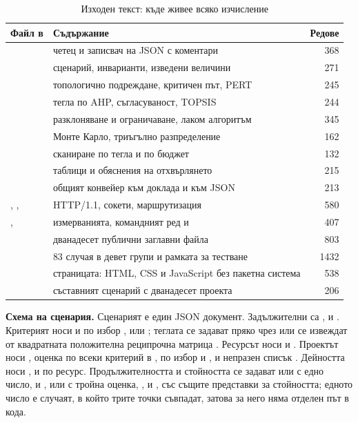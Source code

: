 \begin{table}[H]
\centering
\caption{Изходен текст: къде живее всяко изчисление}
\label{tab:sources}
\small
\begin{tabular}{@{}L{3.2cm}L{7.4cm}r@{}}
\toprule
\textbf{Файл в } & \textbf{Съдържание} & \textbf{Редове} \\
\midrule
{} & четец и записвач на JSON с коментари & 368 \\
 & сценарий, инварианти, изведени величини & 271 \\
 & топологично подреждане, критичен път, PERT & 245 \\
 & тегла по AHP, съгласуваност, TOPSIS & 244 \\
 & разклоняване и ограничаване, лаком алгоритъм & 345 \\
 & Монте Карло, триъгълно разпределение & 162 \\
 & сканиране по тегла и по бюджет & 132 \\
 & таблици и обяснения на отхвърлянето & 215 \\
 & общият конвейер към доклада и към JSON & 213 \\
, ,  & HTTP/1.1, сокети, маршрутизация & 580 \\
,  & измерванията, командният ред и  & 407 \\
\midrule
{} & дванадесет публични заглавни файла & 803 \\
 & 83 случая в девет групи и рамката за тестване & 1432 \\
 & страницата: HTML, CSS и JavaScript без пакетна система & 538 \\
 & съставният сценарий с дванадесет проекта & 206 \\
\bottomrule
\end{tabular}
\end{table}

\textbf{Схема на сценария.} Сценарият е един JSON документ. Задължителни са
,  и . Критерият носи  и по
избор ,  или ; теглата се задават пряко чрез
 или се извеждат от квадратната положителна реципрочна матрица
. Ресурсът носи  и . Проектът носи
, оценка по всеки критерий в , по избор  и
, и непразен списък . Дейността носи ,
 и  по ресурс. Продължителността и стойността се
задават или с едно число,  и , или с тройна оценка,
,  и , със същите представки за
стойността; едното число е случаят, в който трите точки съвпадат, затова за него
няма отделен път в кода.
